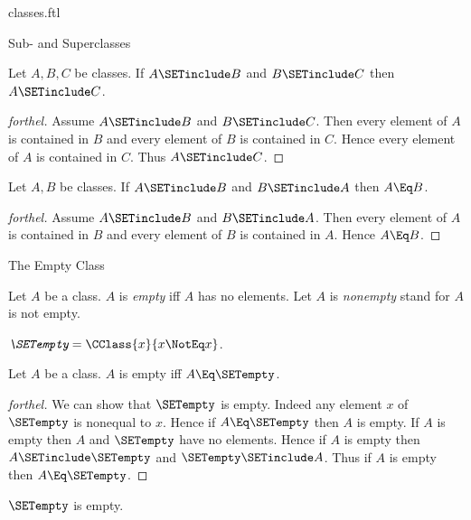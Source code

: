 \documentclass{stex}
\begin{document}
\begin{smodule}{classes.ftl}
\begin{sfragment}{Sub- and Superclasses}
  \begin{proposition}[forthel]
    Let $A, B, C$ be classes.
    If $A \SETinclude B$ and $B \SETinclude C$ then $A \SETinclude C$.
  \end{proposition}
  \begin{proof}[forthel]
    Assume $A \SETinclude B$ and $B \SETinclude C$.
    Then every element of $A$ is contained in $B$ and every element of $B$ is contained in $C$.
    Hence every element of $A$ is contained in $C$.
    Thus $A \SETinclude C$.
  \end{proof}

  \begin{proposition}[forthel]
    Let $A, B$ be classes.
    If $A \SETinclude B$ and $B \SETinclude A$ then $A \Eq B$.
  \end{proposition}
  \begin{proof}[forthel]
    Assume $A \SETinclude B$ and $B \SETinclude A$.
    Then every element of $A$ is contained in $B$ and every element of $B$ is contained in $A$.
    Hence $A \Eq B$.
  \end{proof}
\end{sfragment}

\begin{sfragment}{The Empty Class}
  \begin{definition}[forthel,for={empty,nonempty}]
    Let $A$ be a class.
    $A$ is \emph{empty} iff $A$ has no elements.
    Let $A$ is \emph{nonempty} stand for $A$ is not empty.
  \end{definition}

  \begin{definition}[forthel,for=SETempty]
    $\emph{\SETempty} = \CClass{x}{x \NotEq x}$.
  \end{definition}

  \begin{proposition}[forthel]
    Let $A$ be a class.
    $A$ is empty iff $A \Eq \SETempty$.
  \end{proposition}
  \begin{proof}[forthel]
    We can show that $\SETempty$ is empty.
    Indeed any element $x$ of $\SETempty$ is nonequal to $x$.
    Hence if $A \Eq \SETempty$ then $A$ is empty.
    If $A$ is empty then $A$ and $\SETempty$ have no elements.
    Hence if $A$ is empty then $A \SETinclude \SETempty$ and $\SETempty \SETinclude A$.
    Thus if $A$ is empty then $A \Eq \SETempty$.
  \end{proof}

  \begin{corollary}[forthel]
    $\SETempty$ is empty.
  \end{corollary}


\end{sfragment}
\end{smodule}
\end{document}
